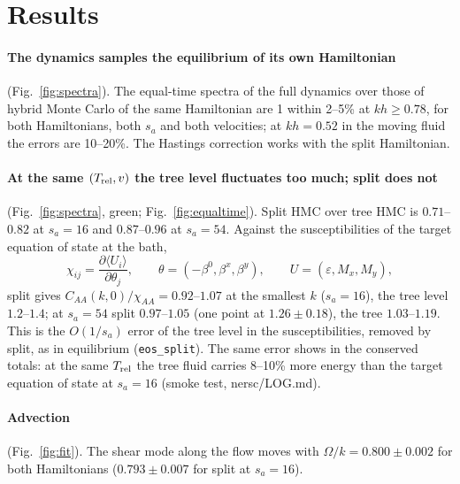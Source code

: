 \documentclass[11pt,aps,preprint,nofootinbib,superscriptaddress,tightenlines]{revtex4-2}
\newcommand{\avg}[1]{\langle #1\rangle}
\def\st{\begin{equation}}
\def\stp{\end{equation}}
\def\Fig#1{Fig.~\ref{#1}}
\let\oldparagraph\paragraph
\renewcommand{\paragraph}{\par\bigskip\oldparagraph}
\begin{document}
\section{Results}
\label{sec:results}

\paragraph{The dynamics samples the equilibrium of its own Hamiltonian} (\Fig{fig:spectra}).  The equal-time spectra of the full dynamics
over those of hybrid Monte Carlo of the same Hamiltonian are 1 within 2--5\% at $kh\ge0.78$, for both Hamiltonians, both $s_a$ and both
velocities; at $kh=0.52$ in the moving fluid the errors are 10--20\%.  The Hastings correction works with the split Hamiltonian.

\paragraph{At the same $(T_{\rm rel},v)$ the tree level fluctuates too much; split does not} (\Fig{fig:spectra}, green; \Fig{fig:equaltime}).
Split HMC over tree HMC is $0.71$--$0.82$ at $s_a=16$ and $0.87$--$0.96$ at $s_a=54$.  Against the susceptibilities of the target equation
of state at the bath,
\st
\chi_{ij}=\frac{\partial\avg{U_i}}{\partial\theta_j},\qquad \theta=(-\beta^0,\beta^x,\beta^y),\qquad U=(\varepsilon,M_x,M_y),
\stp
split gives $C_{AA}(k,0)/\chi_{AA}=0.92$--$1.07$ at the smallest $k$ ($s_a=16$), the tree level $1.2$--$1.4$; at $s_a=54$ split
$0.97$--$1.05$ (one point at $1.26\pm0.18$), the tree $1.03$--$1.19$.  This is the $O(1/s_a)$ error of the tree level in the
susceptibilities, removed by split, as in equilibrium (\texttt{eos\_split}).  The same error shows in the conserved totals: at the same
$T_{\rm rel}$ the tree fluid carries 8--10\% more energy than the target equation of state at $s_a=16$ (smoke test, nersc/LOG.md).

\paragraph{Advection} (\Fig{fig:fit}).  The shear mode along the flow moves with $\Omega/k=0.800\pm0.002$ for both
Hamiltonians ($0.793\pm0.007$ for split at $s_a=16$).
\end{document}
